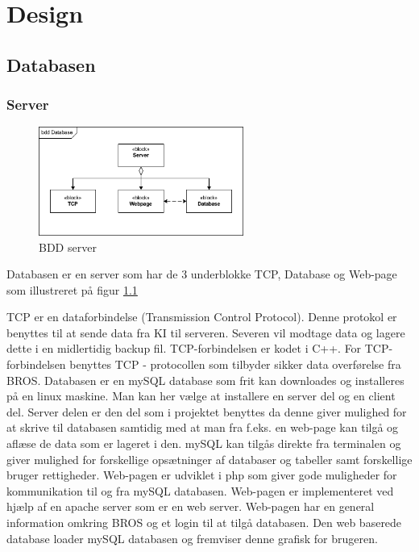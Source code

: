\chapter{Design}
\section{Databasen}
\subsection{Server}
\begin{figure}[htbp]
	\centering
	\includegraphics[width=0.6\textwidth]{billeder/bdd_server}
	\caption{BDD server}
	\label{fig:bdd_server}
\end{figure}

Databasen er en server som har de 3 underblokke TCP, Database og Web-page som illustreret på figur \ref{fig:bdd_server}

TCP er en dataforbindelse (Transmission Control Protocol). Denne protokol er benyttes til at sende data fra KI til serveren. Severen vil modtage data og lagere dette i en midlertidig backup fil. TCP-forbindelsen er kodet i C++.
For TCP-forbindelsen benyttes TCP - protocollen som tilbyder sikker data overførelse fra BROS.
Databasen er en mySQL database som frit kan downloades og installeres på en linux maskine. Man kan her vælge at installere en server del og en client del. Server delen er den del som i projektet benyttes da denne giver mulighed for at skrive til databasen samtidig med at man fra f.eks. en web-page kan tilgå og aflæse de data som er lageret i den. mySQL kan tilgås direkte fra terminalen og giver mulighed for forskellige opsætninger af databaser og tabeller samt forskellige bruger rettigheder.
Web-pagen er udviklet i php som giver gode muligheder for kommunikation til og fra mySQL databasen. Web-pagen er implementeret ved hjælp af en apache server som er en web server. Web-pagen har en general information omkring BROS og et login til at tilgå databasen. Den web baserede database loader mySQL databasen og fremviser denne grafisk for brugeren.

